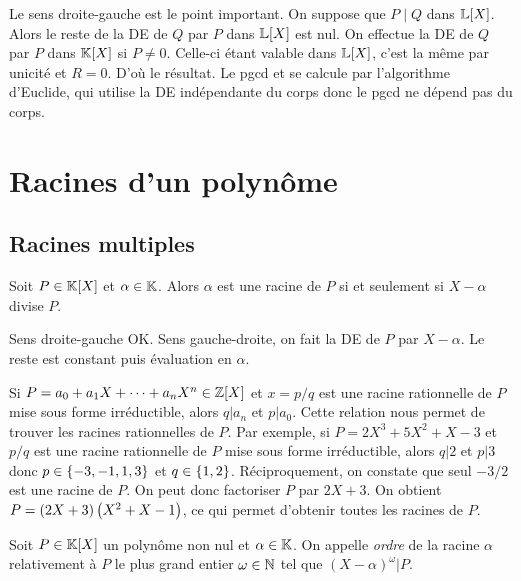 \documentclass{magnolia}
\begin{document}
\begin{preuve}
Le sens droite-gauche est le point important. On suppose que $P\mid Q$ dans $\polyL$. Alors le reste de la DE de $Q$ par $P$ dans $\polyL$ est nul. On effectue la DE de $Q$ par $P$ dans $\polyK$ si $P\neq 0$. Celle-ci étant valable dans $\polyL$, c'est la même par unicité et $R=0$. D'où le résultat.
Le pgcd et se calcule par l'algorithme d'Euclide, qui utilise la DE indépendante du corps donc le pgcd ne dépend pas du corps.
\end{preuve}

\section{Racines d'un polynôme}

\subsection{Racines multiples}


\begin{proposition}
Soit $P\in\polyK$ et $\alpha\in\mathbb{K}$. Alors $\alpha$ est une racine de $P$ si et
seulement si $X-\alpha$ divise $P$.
\end{proposition}

\begin{preuve}
Sens droite-gauche OK.
Sens gauche-droite, on fait la DE de $P$ par $X-\alpha$. Le reste est constant puis évaluation en $\alpha$.
\end{preuve}

\begin{remarqueUnique}
\remarque Si $P=a_0+a_1X+\cdots+a_n X^n\in\polyZ$ et $x=p/q$ est une racine
  rationnelle
  de $P$ mise sous forme irréductible, alors $q|a_n$ et $p|a_0$. Cette relation
  nous permet de trouver les racines rationnelles de
  $P$. Par exemple, si $P=2X^3+5X^2+X-3$ et $p/q$ est une racine rationnelle
  de $P$ mise sous forme irréductible, alors $q|2$ et $p|3$ donc
  $p\in\left\{-3,-1,1,3\right\}$ et $q\in\left\{1,2\right\}$. Réciproquement, on constate
  que seul $-3/2$ est une racine de $P$. On peut donc factoriser $P$ par $2X+3$.
  On obtient $P=\left(2X+3\right)\left(X^2+X-1\right)$, ce qui permet d'obtenir toutes les
  racines de $P$.
\end{remarqueUnique}


\begin{definition}
Soit $P\in\polyK$ un polynôme non nul et $\alpha\in\mathbb{K}$. On appelle \emph{ordre} de la racine $\alpha$ relativement à $P$
le plus grand entier $\omega\in\mathbb{N}$ tel que $(X-\alpha)^\omega|P$.
\end{definition}
\end{document}
